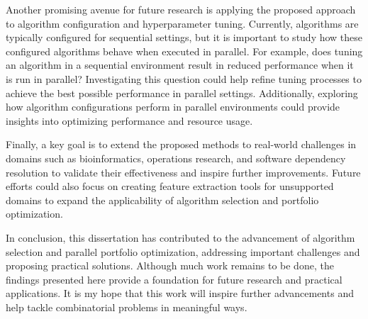 Another promising avenue for future research is applying the proposed approach to algorithm configuration and hyperparameter tuning. Currently, algorithms are typically configured for sequential settings, but it is important to study how these configured algorithms behave when executed in parallel. For example, does tuning an algorithm in a sequential environment result in reduced performance when it is run in parallel? Investigating this question could help refine tuning processes to achieve the best possible performance in parallel settings. Additionally, exploring how algorithm configurations perform in parallel environments could provide insights into optimizing performance and resource usage.

Finally, a key goal is to extend the proposed methods to real-world challenges in domains such as bioinformatics, operations research, and software dependency resolution to validate their effectiveness and inspire further improvements. Future efforts could also focus on creating feature extraction tools for unsupported domains to expand the applicability of algorithm selection and portfolio optimization.

In conclusion, this dissertation has contributed to the advancement of algorithm selection and parallel portfolio optimization, addressing important challenges and proposing practical solutions. Although much work remains to be done, the findings presented here provide a foundation for future research and practical applications. It is my hope that this work will inspire further advancements and help tackle combinatorial problems in meaningful ways.





